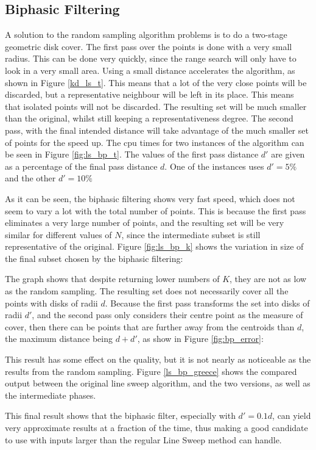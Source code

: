 \subsection{Biphasic Filtering}
A solution to the random sampling algorithm problems is to do a two-stage geometric disk cover. The first pass over the points is done with a very small radius. This can be done very quickly, since the range search will only have to look in a very small area. Using a small distance accelerates the algorithm, as shown in Figure \ref{kd_ls_t}. This means that a lot of the very close points will be discarded, but a representative neighbour will be left in its place. This means that isolated points will not be discarded. The resulting set will be much smaller than the original, whilst still keeping a representativeness degree. The second pass, with the final intended distance will take advantage of the much smaller set of points for the speed up. The cpu times for two instances of the algorithm can be seen in Figure \ref{fig:ls_bp_t}. The values of the first pass distance $d'$ are given as a percentage of the final pass distance $d$. One of the instances uses $d'=5\%$ and the other $d'=10\%$



As it can be seen, the biphasic filtering shows very fast speed, which does not seem to vary a lot with the total number of points. This is because the first pass eliminates a very large number of points, and the resulting set will be very similar for different values of $N$, since the intermediate subset is still representative of the original. Figure \ref{fig:ls_bp_k} shows the variation in size of the final subset chosen by the biphasic filtering:



The graph shows that despite returning lower numbers of $K$, they are not as low as the random sampling. The resulting set does not necessarily cover all the points with disks of radii $d$. Because the first pass transforms the set into disks of radii $d'$, and the second pass only considers their centre point as the measure of cover, then there can be points that are further away from the centroids than $d$, the maximum distance being $d+d'$, as show in Figure \ref{fig:bp_error}:



This result has some effect on the quality, but it is not nearly as noticeable as the results from the random sampling. Figure \ref{ls_bp_greece} shows the compared output between the original line sweep algorithm, and the two versions, as well as the intermediate phases.



This final result shows that the biphasic filter, especially with $d'=0.1d$, can yield very approximate results at a fraction of the time, thus making a good candidate to use with inputs larger than the regular Line Sweep method can handle.